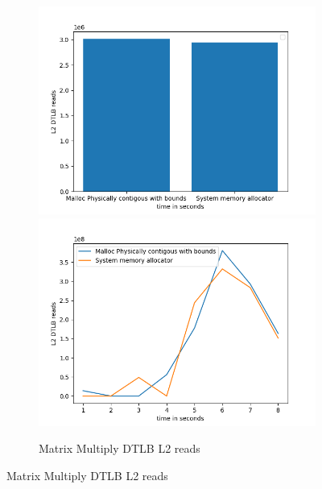 \begin{figure}
  \begin{subfigure}{\linewidth}
    \includegraphics[width=.5\linewidth]{BenchmarkRuns/MatrixMultiply/l2_tlb_200_MatrixMultiply.png}\hfill
    \includegraphics[width=.5\linewidth]{BenchmarkRuns/MatrixMultiply/l2_tlb_1000_MatrixMultiply.png}
  \caption{Matrix Multiply DTLB L2 reads}
  \end{subfigure}\par\medskip
\end{figure}

